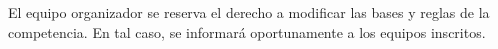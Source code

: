\documentclass[11pt]{article}
\begin{document}
El equipo organizador se reserva el derecho a modificar las bases y reglas de la competencia. En tal caso, se informará oportunamente a los equipos inscritos.


    
    
    

    
    
    
    
    
    
    
    

    
    
\end{document}

